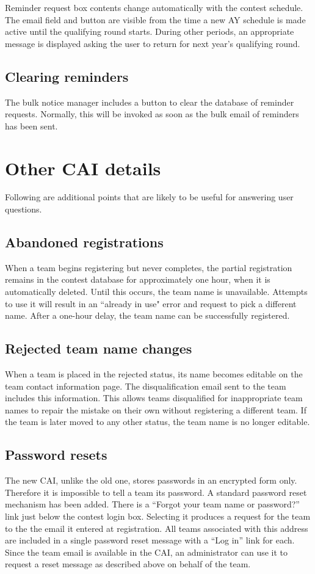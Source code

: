 \documentclass[11pt,letterpaper]{refart}
\begin{document}
Reminder request box contents change automatically with the contest schedule.
The email field and button are visible from the time a new AY schedule is made active until
the qualifying round starts. During other periods, an appropriate message is
displayed asking the user to return for next year's qualifying round.

\subsection{Clearing reminders}
The bulk notice manager includes a button to clear the database of reminder requests.
Normally, this will be invoked as soon as the bulk email of reminders has been sent.

\section{Other CAI details}
Following are additional points that are likely to be useful for
answering user questions.

\subsection{Abandoned registrations}
When a team begins registering but never completes, the partial registration remains
in the contest database for approximately one hour, when it is automatically deleted.  Until
this occurs, the team name is unavailable.  Attempts to use it will result in an ``already in
use" error and request to pick a different name. After a one-hour delay, the team name 
can be successfully registered. 

\subsection{Rejected team name changes}
When a team is placed in the rejected status, its name becomes editable on
the team contact information page. The disqualification email sent to the team includes this 
information. This allows teams disqualified for inappropriate team names to repair the 
mistake on their own without registering a different team.  If the team is later moved to any 
other status, the team name is no longer editable.

\subsection{Password resets}
The new CAI, unlike the old one, stores passwords in an encrypted form only.  Therefore it
is impossible to tell a team its password.  A standard password reset mechanism has been
added.  There is a ``Forgot your team name or password?'' link just below the contest login
box. Selecting it produces  a request for the team to the the email it entered at registration. 
All teams associated with this address are included in a single password reset message with
a ``Log in'' link for each. Since the team email is available in the CAI, an administrator can 
use it to request a reset message as described above on behalf of the team. 
\end{document}
